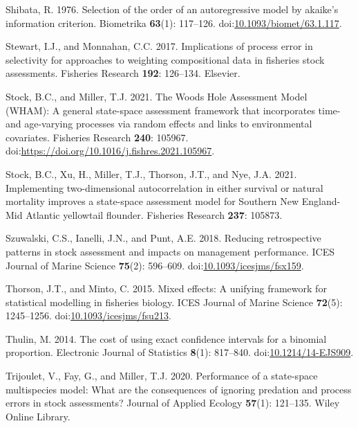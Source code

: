\documentclass[
  12pt,
]{article}
\newlength{\cslhangindent}
\newlength{\cslentryspacingunit} %
\newenvironment{CSLReferences}[2] %
 {%
  \setlength{\parindent}{0pt}
  \ifodd #1
  \let\oldpar\par
  \def\par{\hangindent=\cslhangindent\oldpar}
  \fi
  \setlength{\parskip}{#2\cslentryspacingunit}
 }%
 {}
\begin{document}
\begin{CSLReferences}{1}{0}
\leavevmode{}%
Shibata, R. 1976. Selection of the order of an autoregressive model by
akaike's information criterion. Biometrika \textbf{63}(1): 117--126.
doi:\href{https://doi.org/10.1093/biomet/63.1.117}{10.1093/biomet/63.1.117}.

\leavevmode{}%
Stewart, I.J., and Monnahan, C.C. 2017. Implications of process error in
selectivity for approaches to weighting compositional data in fisheries
stock assessments. Fisheries Research \textbf{192}: 126--134. Elsevier.

\leavevmode{}%
Stock, B.C., and Miller, T.J. 2021. The {W}oods {H}ole {A}ssessment
{M}odel ({WHAM}): {A} general state-space assessment framework that
incorporates time- and age-varying processes via random effects and
links to environmental covariates. Fisheries Research \textbf{240}:
105967. doi:\url{https://doi.org/10.1016/j.fishres.2021.105967}.

\leavevmode{}%
Stock, B.C., Xu, H., Miller, T.J., Thorson, J.T., and Nye, J.A. 2021.
{Implementing two-dimensional autocorrelation in either survival or
natural mortality improves a state-space assessment model for Southern
New England-Mid Atlantic yellowtail flounder}. Fisheries Research
\textbf{237}: 105873.

\leavevmode{}%
Szuwalski, C.S., Ianelli, J.N., and Punt, A.E. 2018. Reducing
retrospective patterns in stock assessment and impacts on management
performance. ICES Journal of Marine Science \textbf{75}(2): 596--609.
doi:\href{https://doi.org/10.1093/icesjms/fsx159}{10.1093/icesjms/fsx159}.

\leavevmode{}%
Thorson, J.T., and Minto, C. 2015. Mixed effects: A unifying framework
for statistical modelling in fisheries biology. ICES Journal of Marine
Science \textbf{72}(5): 1245--1256.
doi:\href{https://doi.org/10.1093/icesjms/fsu213}{10.1093/icesjms/fsu213}.

\leavevmode{}%
Thulin, M. 2014. {The cost of using exact confidence intervals for a
binomial proportion}. Electronic Journal of Statistics \textbf{8}(1):
817--840.
doi:\href{https://doi.org/10.1214/14-EJS909}{10.1214/14-EJS909}.

\leavevmode{}%
Trijoulet, V., Fay, G., and Miller, T.J. 2020. Performance of a
state-space multispecies model: What are the consequences of ignoring
predation and process errors in stock assessments? Journal of Applied
Ecology \textbf{57}(1): 121--135. Wiley Online Library.


\end{CSLReferences}
\end{document}

